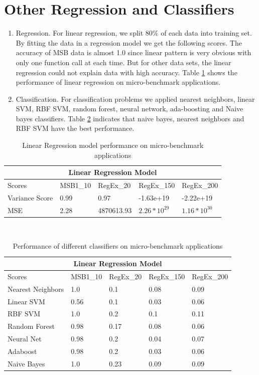 \documentclass{article}
\begin{document}
\section{Other Regression and Classifiers}

\begin{enumerate}
    \item Regression.
    For linear regression, we split 80\% of each data into training set. By fitting the data in a regression model we get the following scores. The accuracy of MSB data is almost 1.0 since linear pattern is very obvious with only one function call at each time. But for other data sets, the linear
    regression could not explain data with high accuracy. Table \ref{tabel6-1} shows the performance of
    linear regression on micro-benchmark applications. 
    \item Classification.
    For classification problems we applied nearest neighbors, linear SVM, RBF SVM, random forest, neural network, ada-boosting and Naive bayes classifiers. Table \ref{tabel6-2} indicates that naive bayes, nearest neighbors and RBF SVM have the best performance.
\end{enumerate}
\begin{table}[t]
  \centering
    \caption{Linear Regression model performance on micro-benchmark applications}
  \label{tabel6-1}
\begin{tabular}{ |p{3cm}||p{1.8cm}|p{1.8cm}|p{1.8cm}|p{1.8cm}| }
 \hline
 \multicolumn{5}{|c|}{Linear Regression Model} \\
 \hline
 Scores & MSB1\_10 & RegEx\_20 &RegEx\_150 & RegEx\_200\\
 \hline
 Variance Score   & 0.99 & 0.97 & -1.63e+19 & -2.22e+19\\
 MSE & 2.28 & 4870613.93 & $2.26*10^{29}$ & $1.16*10^{30}$\\
 \hline
\end{tabular}\\
\end{table}

\begin{table}[t]
  \centering
    \caption{Performance of different classifiers on micro-benchmark applications}
  \label{tabel6-2}
\begin{tabular}{ |p{3cm}||p{1.8cm}|p{1.8cm}|p{1.8cm}|p{1.8cm}| }
 \hline
 \multicolumn{5}{|c|}{Linear Regression Model} \\
 \hline
 Scores & MSB1\_10 & RegEx\_20 &RegEx\_150 & RegEx\_200\\
 \hline
 Nearest Neighbors   & 1.0 & 0.1 & 0.08 & 0.09\\
 Linear SVM & 0.56 & 0.1 & 0.03 & 0.06\\
 RBF SVM & 1.0 & 0.2 & 0.1 & 0.11\\
 Random Forest & 0.98 & 0.17 & 0.08 & 0.06\\
 Neural Net & 0.98 & 0.2 & 0.04 & 0.07\\
 Adaboost & 0.98 & 0.2 & 0.03 & 0.06\\
 Naive Bayes & 1.0 & 0.23 & 0.09 & 0.09\\
 \hline
\end{tabular}\\
\end{table}
\end{document}
